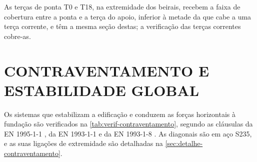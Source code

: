 
As terças de ponta T0 e T18, na extremidade dos beirais, recebem a faixa de
cobertura entre a ponta e a terça do apoio, inferior à metade da que cabe a uma
terça corrente, e têm a mesma seção destas; a verificação das terças correntes
cobre-as.

\section{CONTRAVENTAMENTO E ESTABILIDADE GLOBAL}\label{sec:verif-contraventamento}

Os sistemas que estabilizam a edificação e conduzem as forças horizontais à
fundação são verificados na \autoref{tab:verif-contraventamento}, segundo as
cláusulas da EN 1995-1-1 \cite{EN1995-1-1:2004}, da
EN 1993-1-1 \cite{EN1993-1-1:2005} e da EN 1993-1-8 \cite{EN1993-1-8:2005}. As
diagonais são em aço S235, e as suas ligações de extremidade são detalhadas na
\autoref{sec:detalhe-contraventamento}.

